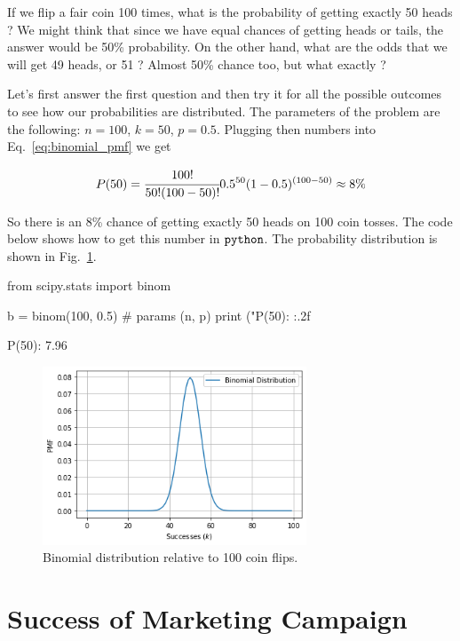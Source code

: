 If we flip a fair coin 100 times, what is the probability of getting exactly 50 heads ? 
We might think that since we have equal chances
of getting heads or tails, the answer would be 50\% probability. On the other hand, what are the odds that we will get 49 heads, or 51 ? Almost 50\% chance too, but what exactly ? 

Let's first answer the first question and then try it for all the possible outcomes to see how our probabilities are distributed. The parameters of the problem are the following: \(n = 100\), \(k = 50\), \(p = 0.5\). Plugging then numbers into Eq.~\ref{eq:binomial_pmf} we get

\[P(50) = \cfrac{100!}{50!(100 - 50)!}0.5^{50}(1-0.5)^{(100-50)} \approx 8\% \]

So there is an 8\% chance of getting exactly 50 heads on 100 coin tosses. The code below shows how to get this number in \(\tt{python}\). The probability distribution is shown in Fig.~\ref{fig:binomial_coin_flip}.

\begin{ipython}
from scipy.stats import binom

b = binom(100, 0.5) # params (n, p)
print ("P(50): {:.2f}%

P(50): 7.96%
\end{ipython}

\begin{figure}[ht]
\centering
    \includegraphics[width=0.7\textwidth]{figures/binomial_2_0.png}
    \caption{Binomial distribution relative to 100 coin flips.}
    \label{fig:binomial_coin_flip}
\end{figure}
    
\section{Success of Marketing Campaign}\label{success-of-marketing-campaign}

